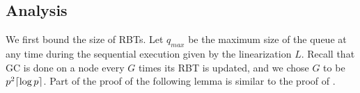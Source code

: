 \subsection{Analysis}
\label{sec::GCanalysis}


We first bound the size of RBTs.  Let $q_{max}$ be the maximum size of the queue at any time during the sequential execution given by the linearization $L$.
Recall that GC is done on a node every $G$ times its RBT is updated, and we chose $G$ to be $p^2\lceil \log p \rceil$.
Part of the proof of the following lemma is similar to the proof of .

